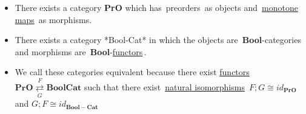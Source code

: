 \begin{itemize}
    \item  There exists a category \textbf{PrO} which has \,preorders\, as objects and \,\hyperref[D1.59]{monotone maps}\, as morphisms.
    \item There exists a category *Bool-Cat* in which the objects are \,\textbf{Bool}-categories\, and morphisms are \,\textbf{Bool}-\hyperref[D2.69]{functors}\,.
    \item We call these categories equivalent because there exist \hyperref[D3.35]{functors} $\mathbf{PrO}\overset{F}{\underset{G}{\rightleftarrows}}\mathbf{BoolCat}$ such that there exist \,\hyperref[D3.49]{natural isomorphisms}\, $F;G \cong id_\mathbf{PrO}$ and $G;F \cong id_\mathbf{Bool-Cat}$
  \end{itemize}
